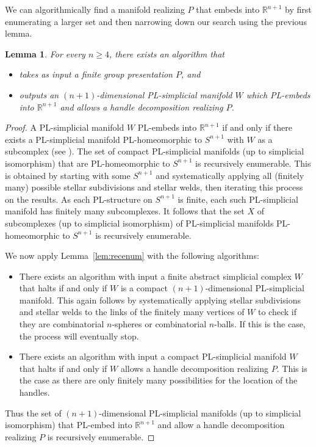 \documentclass[a4paper, reqno]{amsart}
\newtheorem{lemma}[proposition]{Lemma}
\theoremstyle{definition}
\theoremstyle{remark}
\newcommand{\R}{\mathbb{R}}
\renewcommand{\~}{\nobreak\ }
\begin{document}
We can algorithmically find a manifold realizing $P$ that embeds into $\R^{n+1}$ by first enumerating a larger set and then narrowing down our search using the previous lemma.
\begin{lemma}\label{lem:algrelP}
    For every $n\geq4$, there exists an algorithm that
    \begin{itemize}
    \item takes as input a  finite group presentation $P$, and
    \item outputs an $(n+1)$-dimensional PL-simplicial manifold $W$ which PL-embeds into $\mathbb R^{n+1}$ and allows a handle decomposition realizing $P$.
\end{itemize} 
\end{lemma}
\begin{proof}
    A PL-simplicial manifold $W$ PL-embeds into $\R^{n+1}$ if and only if there exists a PL-simplicial manifold PL-homeomorphic to $S^{n+1}$ with $W$ as a subcomplex (see \mbox{\cite[Theorem\~2.14]{rourkesandersonnew}}). The set of compact PL-simplicial manifolds (up to simplicial isomorphism) that are PL-hom\-e\-o\-mor\-phic to $S^{n+1}$ is recursively enumerable. This is obtained by starting with some $S^{n+1}$ and systematically applying all (finitely many) possible stellar subdivisions and stellar welds, then iterating this process on the results. As each PL-structure on $S^{n+1}$ is finite, each such PL-simplicial manifold has finitely many subcomplexes. It follows that the set $X$ of subcomplexes (up to simplicial isomorphism) of PL-simplicial manifolds PL-homeomorphic to $S^{n+1}$ is recursively enumerable.   
    
    We now apply Lemma\~\ref{lem:recenum} with the following algorithms:
    \begin{itemize}
        \item There exists an algorithm with input a finite abstract simplicial complex $W$ that halts if and only if $W$ is a compact $(n+1)$-dimensional PL-simplicial manifold. This again follows by systematically applying stellar subdivisions and stellar welds to the links of the finitely many vertices of $W$ to check if they are combinatorial $n$-spheres or combinatorial $n$-balls. If this is the case, the process will eventually stop.
        \pagebreak
        \item There exists an algorithm with input a compact PL-simplicial manifold $W$ that halts if and only if $W$ allows a handle decomposition realizing $P$. This is the case as there are only finitely many possibilities for the location of the handles. 
    \end{itemize}
    Thus the set of $(n+1)$-dimensional PL-simplicial manifolds (up to simplicial isomorphism) that PL-embed into $\R^{n+1}$ and allow a handle decomposition realizing $P$ is recursively enumerable.
    

\end{proof}
\end{document}
